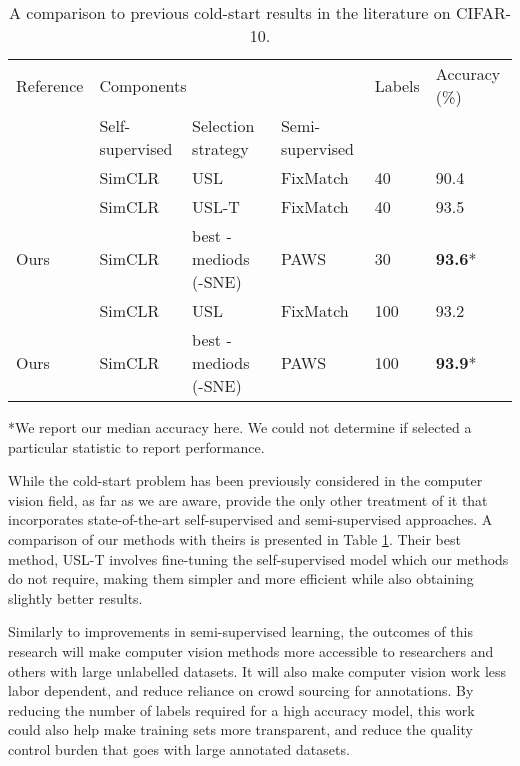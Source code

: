 \documentclass{article}
\begin{document}
\begin{table}[t]
    \caption{A comparison to previous cold-start results in the literature on CIFAR-10.}
    \label{tbl:comparison_to_wang2022}
    \begin{tabular}{llllll}
      \hline
    Reference & \multicolumn{3}{l}{Components}   & Labels & Accuracy (\%) \\ 
    \cmidrule{2-4} 
     & Self-supervised & Selection strategy & Semi-supervised  & & \\ 
      \hline
    \citep{wang2022unsupervised} & SimCLR & USL & FixMatch & 40 & 90.4 \\ 
    \citep{wang2022unsupervised} & SimCLR & USL-T & FixMatch & 40 & 93.5 \\ 
      Ours & SimCLR & best -mediods (-SNE) & PAWS & 30 & \textbf{93.6}* \\
      \hline
    \citep{wang2022unsupervised} & SimCLR & USL & FixMatch & 100 & 93.2 \\ 
      Ours & SimCLR & best -mediods (-SNE) & PAWS & 100 & \textbf{93.9}* \\ 
       \hline
    \end{tabular}
    \footnotesize
    *We report our median accuracy here. We could not determine if \cite{wang2022unsupervised} selected a particular statistic to report performance.
\end{table}

While the cold-start problem has been previously considered in the computer vision field, as far as we are aware, \cite{wang2022unsupervised} provide the only other treatment of it that incorporates state-of-the-art self-supervised and semi-supervised approaches. A comparison of our methods with theirs is presented in Table \ref{tbl:comparison_to_wang2022}. Their best method, USL-T involves fine-tuning the self-supervised model which our methods do not require, making them simpler and more efficient while also obtaining slightly better results.

Similarly to improvements in semi-supervised learning, the outcomes of this research will make computer vision methods more accessible to researchers and others with large unlabelled datasets. It will also make computer vision work less labor dependent, and reduce reliance on crowd sourcing for annotations. By reducing the number of labels required for a high accuracy model, this work could also help make training sets more transparent, and reduce the quality control burden that goes with large annotated datasets.
\end{document}
